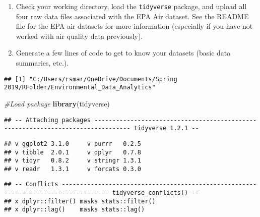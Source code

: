 \documentclass[]{article}
\newenvironment{Shaded}{\begin{snugshade}}{\end{snugshade}}
\newcommand{\KeywordTok}[1]{\textcolor[rgb]{0.13,0.29,0.53}{\textbf{#1}}}
\newcommand{\CommentTok}[1]{\textcolor[rgb]{0.56,0.35,0.01}{\textit{#1}}}
\newcommand{\NormalTok}[1]{#1}
\begin{document}
\begin{enumerate}
\def\labelenumi{\arabic{enumi}.}
\item
  Check your working directory, load the \texttt{tidyverse} package, and
  upload all four raw data files associated with the EPA Air dataset.
  See the README file for the EPA air datasets for more information
  (especially if you have not worked with air quality data previously).
\item
  Generate a few lines of code to get to know your datasets (basic data
  summaries, etc.).
\end{enumerate}

\begin{Shaded}
\end{Shaded}

\begin{verbatim}
## [1] "C:/Users/rsmar/OneDrive/Documents/Spring 2019/RFolder/Environmental_Data_Analytics"
\end{verbatim}

\begin{Shaded}
\begin{Highlighting}[]
\CommentTok{#Load package}
\KeywordTok{library}\NormalTok{(tidyverse)}
\end{Highlighting}
\end{Shaded}

\begin{verbatim}
## -- Attaching packages -------------------------------------------------------------------------------- tidyverse 1.2.1 --
\end{verbatim}

\begin{verbatim}
## v ggplot2 3.1.0     v purrr   0.2.5
## v tibble  2.0.1     v dplyr   0.7.8
## v tidyr   0.8.2     v stringr 1.3.1
## v readr   1.3.1     v forcats 0.3.0
\end{verbatim}

\begin{verbatim}
## -- Conflicts ----------------------------------------------------------------------------------- tidyverse_conflicts() --
## x dplyr::filter() masks stats::filter()
## x dplyr::lag()    masks stats::lag()
\end{verbatim}
\end{document}
